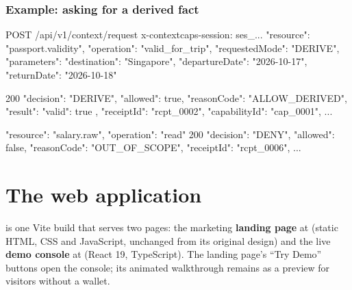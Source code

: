 \documentclass[11pt,a4paper]{article}
\begin{document}
\subsubsection{Example: asking for a derived fact}
\begin{codebox}[language=json]
POST /api/v1/context/request          x-contextcaps-session: ses_...
{ "resource": "passport.validity", "operation": "valid_for_trip", "requestedMode": "DERIVE",
  "parameters": { "destination": "Singapore", "departureDate": "2026-10-17", "returnDate": "2026-10-18" } }

200 { "decision": "DERIVE", "allowed": true, "reasonCode": "ALLOW_DERIVED",
      "result": { "valid": true }, "receiptId": "rcpt_0002", "capabilityId": "cap_0001", ... }

{ "resource": "salary.raw", "operation": "read" }
200 { "decision": "DENY", "allowed": false, "reasonCode": "OUT_OF_SCOPE", "receiptId": "rcpt_0006", ... }
\end{codebox}

\section{The web application}\label{sec:web}

 is one Vite build that serves two pages: the marketing \textbf{landing page} at \code{/} (static HTML, CSS and JavaScript, unchanged from its original design) and the live \textbf{demo console} at  (React 19, TypeScript). The landing page's ``Try Demo'' buttons open the console; its animated walkthrough remains as a preview for visitors without a wallet.
\end{document}
